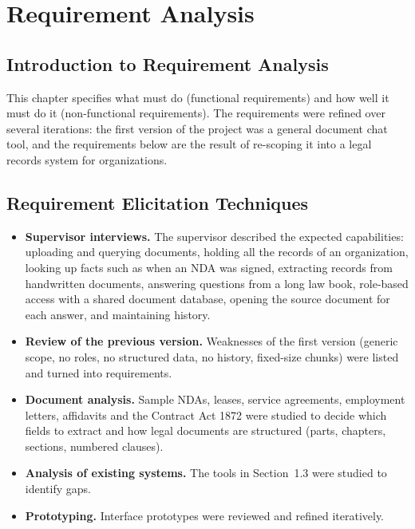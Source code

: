 \chapter{Requirement Analysis}

\section{Introduction to Requirement Analysis}
This chapter specifies what \sysname{} must do (functional requirements) and how well it must do it
(non-functional requirements). The requirements were refined over several iterations: the first
version of the project was a general document chat tool, and the requirements below are the result of
re-scoping it into a legal records system for organizations.

\section{Requirement Elicitation Techniques}
\begin{itemize}
\item \textbf{Supervisor interviews.} The supervisor described the expected capabilities: uploading and
querying documents, holding all the records of an organization, looking up facts such as when an NDA
was signed, extracting records from handwritten documents, answering questions from a long law book,
role-based access with a shared document database, opening the source document for each answer, and
maintaining history.
\item \textbf{Review of the previous version.} Weaknesses of the first version (generic scope, no roles,
no structured data, no history, fixed-size chunks) were listed and turned into requirements.
\item \textbf{Document analysis.} Sample NDAs, leases, service agreements, employment letters, affidavits
and the Contract Act 1872 were studied to decide which fields to extract and how legal documents are
structured (parts, chapters, sections, numbered clauses).
\item \textbf{Analysis of existing systems.} The tools in Section~1.3 were studied to identify gaps.
\item \textbf{Prototyping.} Interface prototypes were reviewed and refined iteratively.
\end{itemize}

